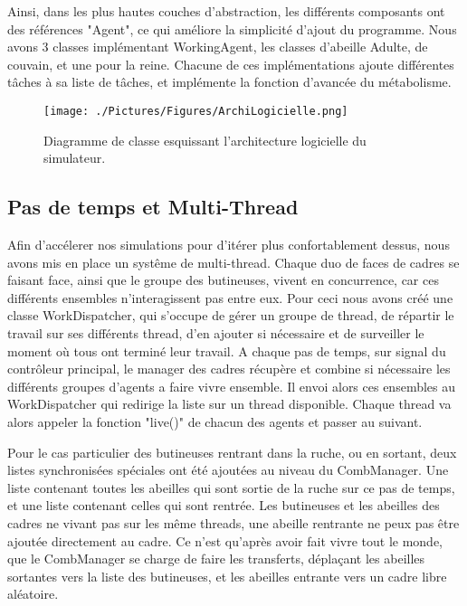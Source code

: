 			Ainsi, dans les plus hautes couches d'abstraction, les différents composants ont des références "Agent", ce qui améliore la simplicité d'ajout du programme. Nous avons 3 classes implémentant WorkingAgent, les classes d'abeille Adulte, de couvain, et une pour la reine. Chacune de ces implémentations ajoute différentes tâches à sa liste de tâches, et implémente la fonction d'avancée du métabolisme.
			
			\begin{figure}
			\centering
			\texttt{[image: ./Pictures/Figures/ArchiLogicielle.png]}
			\caption{Diagramme de classe esquissant l'architecture logicielle du simulateur.}
			\label{ArchiLogicielle}
			\end{figure}
			
			\subsection{Pas de temps et Multi-Thread}
			Afin d'accélerer nos simulations pour d'itérer plus confortablement dessus, nous avons mis en place un systême de multi-thread. Chaque duo de faces de cadres se faisant face, ainsi que le groupe des butineuses, vivent en concurrence, car ces différents ensembles n'interagissent pas entre eux. Pour ceci nous avons créé une classe WorkDispatcher, qui s'occupe de gérer un groupe de thread, de répartir le travail sur ses différents thread, d'en ajouter si nécessaire et de surveiller le moment où tous ont terminé leur travail. A chaque pas de temps, sur signal du contrôleur principal, le manager des cadres récupère et combine si nécessaire les différents groupes d'agents a faire vivre ensemble. Il envoi alors ces ensembles au WorkDispatcher qui redirige la liste sur un thread disponible. Chaque thread va alors appeler la fonction "live()" de chacun des agents et passer au suivant.
			
			Pour le cas particulier des butineuses rentrant dans la ruche, ou en sortant, deux listes synchronisées spéciales ont été ajoutées au niveau du CombManager. Une liste contenant toutes les abeilles qui sont sortie de la ruche sur ce pas de temps, et une liste contenant celles qui sont rentrée. Les butineuses et les abeilles des cadres ne vivant pas sur les même threads, une abeille rentrante ne peux pas être ajoutée directement au cadre. Ce n'est qu'après avoir fait vivre tout le monde, que le CombManager se charge de faire les transferts, déplaçant les abeilles sortantes vers la liste des butineuses, et les abeilles entrante vers un cadre libre aléatoire.
			
